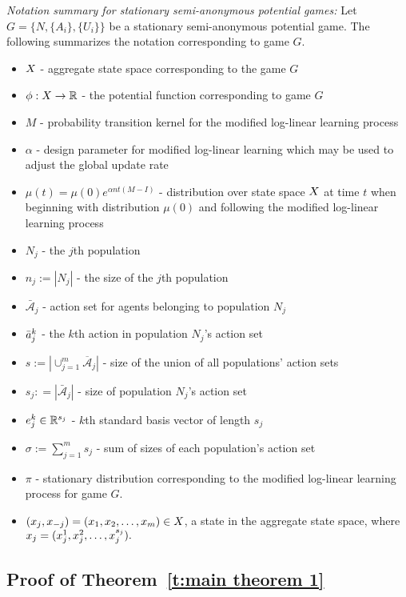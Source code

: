 \noindent\emph{Notation summary for stationary semi-anonymous potential games:}
Let $G = \{N,\{A_i\},\{U_i\}\}$ be a stationary semi-anonymous potential game. The following summarizes the notation corresponding to game $G.$
\begin{itemize}
\item $X$ - aggregate state space corresponding to the game $G$
\item $\phi: X\to \mathbb{R}$ - the potential function corresponding to game $G$
\item $M$ - probability transition kernel for the modified log-linear learning process
\item $\alpha$ - design parameter for modified log-linear learning which may be used to adjust the global update rate 
\item $\mu(t) = \mu(0)e^{\alpha nt(M-I)}$ - distribution over state space $X$ at time $t$ when beginning with distribution $\mu(0)$ and following the modified log-linear learning process
\item $N_j$ - the $j$th population
\item $n_j:= |N_j|$ - the size of the $j$th population
\item $\bar{\mathcal{A}}_j$ - action set for agents belonging to population $N_j$
\item $\bar{a}_j^k$ - the $k$th action in population $N_j$'s action set
\item $s:= |\cup_{j= 1}^m \overline{\mathcal{A}}_j|$  - size of the union of all populations' action sets
\item $s_j: = |\bar{\mathcal{A}}_j|$ - size of population $N_j$'s action set
\item $e_j^k\in \mathbb{R}^{s_j}$ - $k$th standard basis vector of length $s_j$
\item $\sigma:= \sum_{j = 1}^m s_j$ - sum of sizes of each population's action set
\item $\pi$ - stationary distribution corresponding to the modified log-linear learning process for game $G$.
\item $(x_{j},x_{-j}) = (x_{1},x_{2},\ldots,x_{m})\in X$, a state in the aggregate state space, where $x_{j} = (x_{j}^1,x_{j}^2,\ldots,x_{j}^{s_j}).$
\end{itemize}



\subsection{Proof of Theorem~\ref{t:main theorem 1}}\label{a:theorem 1 proof}


